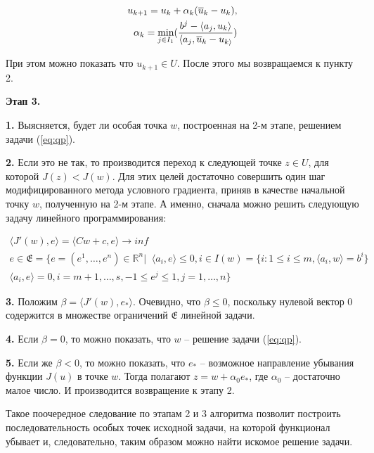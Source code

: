 \documentclass[a4paper, 12pt, titlepage]{article}
\theoremstyle{definition}
\theoremstyle{plain}
\theoremstyle{plain}
\begin{document}
\begin{equation}
 \begin{aligned}
  u_{k + 1} = u_{k} + \alpha_{k} (\overline{u}_{k} - u_{k}), \\
  \alpha_{k} = \operatornamewithlimits{min}_{j \in I_{1}}
  (\frac{b^{j} - \langle a_{j}, u_{k} \rangle}
  {\langle a_{j}, \overline{u}_{k} - u_{k \rangle}})
 \end{aligned}
\end{equation}

При этом можно показать что $u_{k + 1} \in U$. После этого мы возвращаемся к
пункту 2.

\textbf{Этап 3.} 

\textbf{1.} Выясняется, будет ли особая точка $w$, построенная на 2-м
этапе, решением задачи (\ref{eq:qp}).

\textbf{2.} Если это не так, то производится переход
к следующей точке $z \in U$, для которой $J(z) < J(w)$. Для этих целей 
достаточно совершить один шаг модифицированного метода условного градиента,
приняв в качестве начальной точку $w$, полученную на 2-м этапе. А именно,
сначала можно решить следующую задачу линейного программирования:

\begin{equation}
 \begin{aligned}
 \langle J'(w), e \rangle = \langle C w + c, e \rangle \to inf \\
 e \in \mathfrak{E} = \{e = (e^{1}, \ldots, e^{n}) \in \mathbb{R}^{n} | \;\;
 \langle a_{i}, e \rangle \leq 0, i \in I(w) = \{i: 1 \leq i \leq m,
 \langle a_{i}, w \rangle = b^{i}\} \\
 \langle a_{i}, e \rangle = 0, i = m + 1, \ldots, s, -1 \leq e^{j} \leq 1,
 j = 1, \ldots, n\}
 \end{aligned}
\end{equation}

\textbf{3.} Положим $\beta = \langle J'(w), e_{*} \rangle$. Очевидно, что
$\beta \leq 0$, поскольку нулевой вектор $0$ содержится в множестве
ограничений $\mathfrak{E}$ линейной задачи.

\textbf{4.} Если $\beta = 0$, то можно показать, что $w$ -- решение задачи
(\ref{eq:qp}).

\textbf{5.} Если же $\beta < 0$, то можно показать, что $e_{*}$ -- возможное
направление убывания функции $J(u)$ в точке $w$. Тогда полагают
$z = w + \alpha_{0} e_{*}$, где $\alpha_{0}$ -- достаточно малое число. И
производится возвращение к этапу 2.

Такое поочередное следование по этапам 2 и 3 алгоритма позволит 
построить последовательность особых точек исходной задачи, на которой 
функционал убывает и, следовательно, таким образом можно найти искомое решение
задачи.
\end{document}
